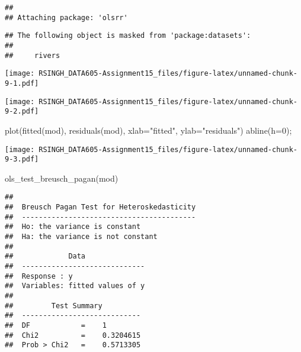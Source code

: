 \documentclass[
]{article}
\newenvironment{Shaded}{\begin{snugshade}}{\end{snugshade}}
\newcommand{\AttributeTok}[1]{\textcolor[rgb]{0.77,0.63,0.00}{#1}}
\newcommand{\DecValTok}[1]{\textcolor[rgb]{0.00,0.00,0.81}{#1}}
\newcommand{\FunctionTok}[1]{\textcolor[rgb]{0.00,0.00,0.00}{#1}}
\newcommand{\NormalTok}[1]{#1}
\newcommand{\OtherTok}[1]{\textcolor[rgb]{0.56,0.35,0.01}{#1}}
\newcommand{\SpecialCharTok}[1]{\textcolor[rgb]{0.00,0.00,0.00}{#1}}
\newcommand{\StringTok}[1]{\textcolor[rgb]{0.31,0.60,0.02}{#1}}
\begin{document}
\begin{verbatim}
## 
## Attaching package: 'olsrr'
\end{verbatim}

\begin{verbatim}
## The following object is masked from 'package:datasets':
## 
##     rivers
\end{verbatim}

\begin{Shaded}
\end{Shaded}

\texttt{[image: RSINGH\_DATA605-Assignment15\_files/figure-latex/unnamed-chunk-9-1.pdf]}

\begin{Shaded}
\end{Shaded}

\texttt{[image: RSINGH\_DATA605-Assignment15\_files/figure-latex/unnamed-chunk-9-2.pdf]}

\begin{Shaded}
\begin{Highlighting}[]
\FunctionTok{plot}\NormalTok{(}\FunctionTok{fitted}\NormalTok{(mod), }\FunctionTok{residuals}\NormalTok{(mod), }\AttributeTok{xlab=}\StringTok{"fitted"}\NormalTok{, }\AttributeTok{ylab=}\StringTok{"residuals"}\NormalTok{)}
\FunctionTok{abline}\NormalTok{(}\AttributeTok{h=}\DecValTok{0}\NormalTok{);}
\end{Highlighting}
\end{Shaded}

\texttt{[image: RSINGH\_DATA605-Assignment15\_files/figure-latex/unnamed-chunk-9-3.pdf]}

\begin{Shaded}
\begin{Highlighting}[]
\FunctionTok{ols\_test\_breusch\_pagan}\NormalTok{(mod)}
\end{Highlighting}
\end{Shaded}

\begin{verbatim}
## 
##  Breusch Pagan Test for Heteroskedasticity
##  -----------------------------------------
##  Ho: the variance is constant            
##  Ha: the variance is not constant        
## 
##             Data              
##  -----------------------------
##  Response : y 
##  Variables: fitted values of y 
## 
##         Test Summary         
##  ----------------------------
##  DF            =    1 
##  Chi2          =    0.3204615 
##  Prob > Chi2   =    0.5713305
\end{verbatim}
\end{document}
